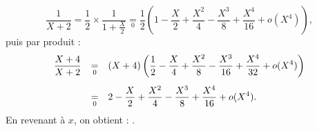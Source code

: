 \documentclass[a4paper, 11pt,reqno]{article}
\begin{document}
\begin{correction}
\begin{enumerate}
		      $$\frac{1}{X+2} = \frac{1}{2} \times \frac{1}{1+\frac{X}{2}} \underset{0}{=} \frac{1}{2} \left(1-\frac{X}{2}+\frac{X^2}{4}-\frac{X^3}{8}+\frac{X^4}{16}+o(X^4)\right),$$
		      puis par produit :
		      $$\begin{array}{rcl}
				      \ddp \frac{X+4}{X+2} & \underset{0}{=} & \ddp (X+4)\left(\frac{1}{2}-\frac{X}{4}+\frac{X^2}{8}-\frac{X^3}{16}+\frac{X^4}{32}+o(X^4)\right)\vsec \\
				                           & \underset{0}{=} & \ddp 2 - \frac{X}{2} +\frac{X^2}{4} - \frac{X^3}{8} + \frac{X^4}{16} + o(X^4).
			      \end{array}$$
		      En revenant \`a $x$, on obtient :
		      .\\



\end{enumerate}
\end{correction}
\end{document}
